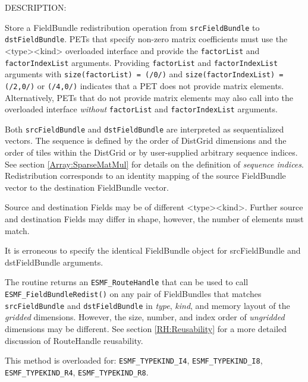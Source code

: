 {\sf DESCRIPTION:\\ }


  
   \begin{sloppypar}
   Store a FieldBundle redistribution operation from {\tt srcFieldBundle}
   to {\tt dstFieldBundle}. PETs that specify non-zero matrix coefficients must use
   the <type><kind> overloaded interface and provide the {\tt factorList} and
   {\tt factorIndexList} arguments. Providing {\tt factorList} and
   {\tt factorIndexList} arguments with {\tt size(factorList) = (/0/)} and
   {\tt size(factorIndexList) = (/2,0/)} or {\tt (/4,0/)} indicates that a
   PET does not provide matrix elements. Alternatively, PETs that do not
   provide matrix elements may also call into the overloaded interface
   {\em without} {\tt factorList} and {\tt factorIndexList} arguments.
   \end{sloppypar}
  
   Both {\tt srcFieldBundle} and {\tt dstFieldBundle} are interpreted as sequentialized
   vectors. The
   sequence is defined by the order of DistGrid dimensions and the order of
   tiles within the DistGrid or by user-supplied arbitrary sequence indices. See
   section \ref{Array:SparseMatMul} for details on the definition of {\em sequence indices}.
   Redistribution corresponds to an identity mapping of the source FieldBundle vector to
   the destination FieldBundle vector.
  
   Source and destination Fields may be of different <type><kind>. Further source
   and destination Fields may differ in shape, however, the number of elements
   must match.
  
   It is erroneous to specify the identical FieldBundle object for srcFieldBundle and dstFieldBundle
   arguments.
  
   The routine returns an {\tt ESMF\_RouteHandle} that can be used to call
   {\tt ESMF\_FieldBundleRedist()} on any pair of FieldBundles that matches
   {\tt srcFieldBundle} and {\tt dstFieldBundle} in {\em type}, {\em kind},
   and memory layout of the {\em gridded} dimensions. However, the size,
   number, and index order of {\em ungridded} dimensions may be different.
   See section \ref{RH:Reusability} for a more detailed discussion of
   RouteHandle reusability.
  
   This method is overloaded for:\newline
   {\tt ESMF\_TYPEKIND\_I4}, {\tt ESMF\_TYPEKIND\_I8},\newline
   {\tt ESMF\_TYPEKIND\_R4}, {\tt ESMF\_TYPEKIND\_R8}.
   \newline
  
